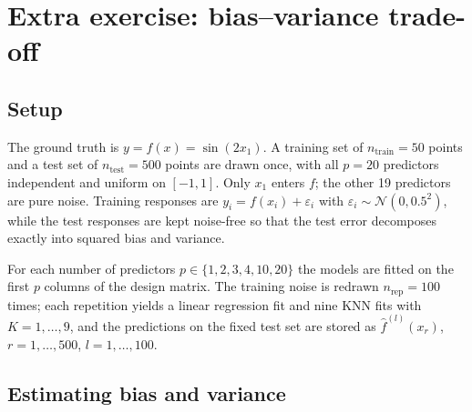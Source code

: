 
\section*{Extra exercise: bias--variance trade-off}

\subsection*{Setup}

The ground truth is $y = f(x) = \sin(2x_1)$. A training set of $n_{\text{train}} = 50$ points and a test set of $n_{\text{test}} = 500$ points are drawn once, with all $p = 20$ predictors independent and uniform on $[-1, 1]$. Only $x_1$ enters $f$; the other 19 predictors are pure noise. Training responses are $y_i = f(x_i) + \varepsilon_i$ with $\varepsilon_i \sim \mathcal N(0, 0.5^2)$, while the test responses are kept noise-free so that the test error decomposes exactly into squared bias and variance.

For each number of predictors $p \in \{1, 2, 3, 4, 10, 20\}$ the models are fitted on the first $p$ columns of the design matrix. The training noise is redrawn $n_{\text{rep}} = 100$ times; each repetition yields a linear regression fit and nine KNN fits with $K = 1, \dots, 9$, and the predictions on the fixed test set are stored as $\hat f^{(l)}(x_r)$, $r = 1, \dots, 500$, $l = 1, \dots, 100$.

\subsection*{Estimating bias and variance}

